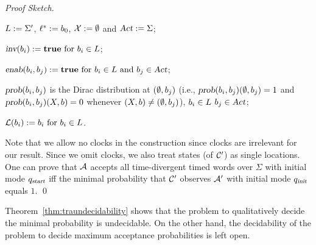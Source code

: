 \begin{proof}[Proof Sketch]
\begin{compactitem}
    \item $L      :=  \Sigma'$, $\ell^*     :=  b_{0} $, $\mathcal{X}    :=  \emptyset $ and $\mbox{\sl Act}      :=  \Sigma $;
    \item $\mbox{\sl inv}(b_{i})              :=  \mathbf{true}
                                            \text{ for }
                                            b_{i} \in L$;
    \item $\mbox{\sl enab}(b_{i},b_{j})   :=  \mathbf{true}
                                            \text{ for }
                                            b_{i} \in L
                                            \text{ and }
                                            b_{j} \in \mbox{\sl Act}$;
    \item $\mbox{\sl prob}(b_{i},b_{j})$ is the Dirac distribution at $(\emptyset,b_{j})$ (i.e., $\mbox{\sl prob}(b_{i},b_{j})(\emptyset,b_{j})=1$ and $\mbox{\sl prob}(b_{i},b_{j})(X,b)=0$ whenever $(X,b)\ne(\emptyset,b_{j})$),
                                            $b_{i} \in L$
                                            $b_{j} \in \mbox{\sl Act}$;
    \item $\mathcal{L}(b_{i})           :=  b_{i}
                                            \text{ for } b_{i} \in L$.
\end{compactitem}
Note that we allow no clocks in the construction since clocks are irrelevant for our result.
Since we omit clocks, we also treat states (of $\mathcal{C}'$) as single locations.
One can prove that $\mathcal{A}$ accepts all time-divergent timed words over $\Sigma$ with initial mode $q_{\mbox{\sl\scriptsize start}}$ iff
the minimal probability that $\mathcal{C}'$ observes $\mathcal{A}'$ with initial mode $q_{\mbox{\sl\scriptsize init} }$ equals $1$.
\qed
\end{proof}

\begin{remark}
Theorem~\ref{thm:traundecidability} shows that the problem to qualitatively decide the minimal probability is undecidable.
On the other hand, the decidability of the problem to decide maximum acceptance probabilities is left open.
\end{remark}

